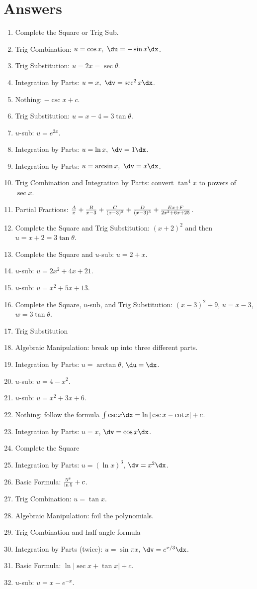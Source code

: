 \documentclass{hw}
\begin{document}
\newpage
\section*{Answers}
\begin{enumerate}
\item Complete the Square or Trig Sub.
\item Trig Combination: $u=\cos{x},\ \du=-\sin{x}\dx$.
\item Trig Substitution: $u=2x=\sec{\theta}$.
\item Integration by Parts: $u=x,\ \dv=\sec^{2}{x}\dx$.
\item Nothing: $-\csc{x}+c$.
\item Trig Substitution: $u=x-4=3\tan{\theta}$.
\item $u$-sub: $u=e^{2x}$.
\item Integration by Parts: $u=\ln{x},\ \dv=1\dx$.
\item Integration by Parts: $u=\arcsin{x},\ \dv=x\dx$.
\item Trig Combination and Integration by Parts: convert $\tan^{4}{x}$ to powers of $\sec{x}$.
\item Partial Fractions: ${A\over x}+{B\over x-3}+{C\over(x-3)^{2}}+{D\over(x-3)^{3}}
+{Ex+F\over 2x^{2}+6x+25}$.
\item Complete the Square and Trig Substitution: $(x+2)^{2}$ and then $u=x+2=3\tan{\theta}$.
\item Complete the Square and $u$-sub: $u=2+x$.
\item $u$-sub: $u=2x^{2}+4x+21$.
\item $u$-sub: $u=x^{2}+5x+13$.
\item Complete the Square, $u$-sub, and Trig Substitution: $(x-3)^{2}+9$, $u=x-3$, $w=3\tan{\theta}$.
\item Trig Substitution
\item Algebraic Manipulation: break up into three different parts.
\item Integration by Parts: $u=\arctan{\theta}$, $\du=\dx$.
\item $u$-sub: $u=4-x^{2}$.
\item $u$-sub: $u=x^{2}+3x+6$.
\item Nothing: follow the formula $\int\csc{x}\dx=\ln{|\csc{x}-\cot{x}|}+c$.
\item Integration by Parts: $u=x$, $\dv=\cos{x}\dx$.
\item Complete the Square
\item Integration by Parts: $u=(\ln{x})^{3}$, $\dv=x^{2}\dx$.
\item Basic Formula: ${5^{x}\over\ln{5}}+c$.
\item Trig Combination: $u=\tan{x}$.
\item Algebraic Manipulation: foil the polynomials.
\item Trig Combination and half-angle formula
\item Integration by Parts (twice): $u=\sin{\pi x}$, $\dv=e^{x/3}\dx$.
\item Basic Formula: $\ln{|\sec{x}+\tan{x}|}+c$.
\item $u$-sub: $u=x-e^{-x}$.
\end{enumerate}
\end{document}
